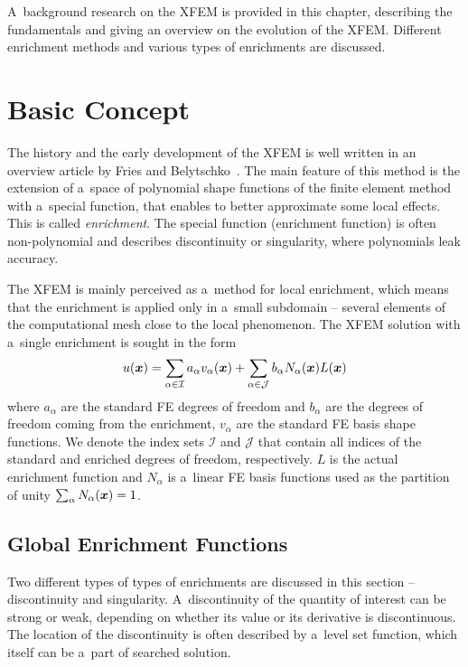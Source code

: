 
A~background research on the XFEM is provided in this chapter,
describing the fundamentals and giving an overview on the evolution of the XFEM.
Different enrichment methods and various types of enrichments are discussed.

\section{Basic Concept} \label{sec:soa_xfem}

The history and the early development of the XFEM is well written
in an overview article by Fries and Belytschko~\cite{fries_xfem_overview_2010}.
The main feature of this method is the extension of a~space of polynomial shape functions of the finite element
method with a~special function, that enables to better approximate some local effects. This is called \emph{enrichment}.
The special function (enrichment function) is often non-polynomial and describes discontinuity or singularity,
where polynomials leak accuracy.

The XFEM is mainly perceived as a~method for local enrichment, which means that the enrichment is applied only
in a~small subdomain -- several elements of the computational mesh close to the local phenomenon.
The XFEM solution with a~single enrichment is sought in the form
\begin{equation} \label{eqn:soa_xfem_standard_form}
  u(\mathbf{\boldsymbol{x}}) = \sum_{\alpha\in\mathcal{I}}a_\alpha v_\alpha(\mathbf{\boldsymbol{x}})
    + \sum_{\alpha\in\mathcal{J}} b_{\alpha} N_\alpha(\mathbf{\boldsymbol{x}})L(\mathbf{\boldsymbol{x}})
\end{equation}
where $a_\alpha$ are the standard FE degrees of freedom and $b_{\alpha}$ are the degrees of freedom coming from
the enrichment, $v_\alpha$ are the standard FE basis shape functions. We denote the index sets $\mathcal{I}$ and
$\mathcal{J}$ that contain all indices of the standard and enriched degrees of freedom, respectively.
$L$ is the actual enrichment function and $N_\alpha$ is a~linear FE basis functions used as the partition of unity
$\sum_\alpha N_\alpha(\mathbf{\boldsymbol{x}}) = 1$.

\subsection{Global Enrichment Functions} \label{sec:global_enrichment}
Two different types of types of enrichments are discussed in this section -- discontinuity and singularity.
A~discontinuity of the quantity of interest can be strong or weak, depending on whether its value
or its derivative is discontinuous. The location of the discontinuity is often described by a~level set function,
which itself can be a~part of searched solution.


